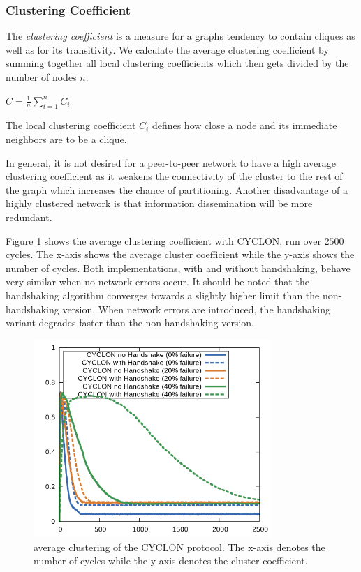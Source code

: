 \documentclass[11pt, english, screen]{report-rd-info}
\begin{document}
\subsubsection{Clustering Coefficient}

The \emph{clustering coefficient} is a measure for a graphs tendency to contain cliques as well as for its transitivity.
We calculate the average clustering coefficient by summing together all local clustering coefficients which then gets divided by the number of nodes $n$. 

$\bar{C} = \frac{1}{n}\sum\limits_{i=1}^{n} C_i$


The local clustering coefficient $C_i$ defines how close a node and its immediate neighbors are to be a clique.

In general, it is not desired for a peer-to-peer network to have a high average clustering coefficient as it weakens the connectivity of the cluster to the rest of the graph which increases the chance of partitioning.
Another disadvantage of a highly clustered network is that information dissemination will be more redundant.


Figure \ref{fig:cluster_cyclon3} shows the average clustering coefficient with CYCLON, run over $2500$ cycles. The x-axis shows the average cluster coefficient while the y-axis shows the number of cycles.
Both implementations, with and without handshaking, behave very similar when no network errors occur.
It should be noted that the handshaking algorithm converges towards a slightly higher limit than the non-handshaking version.
When network errors are introduced, the handshaking variant degrades faster than the non-handshaking version.


\begin{figure}
    \centering
    \includegraphics[width=9cm]{Images/statistics/cyclon_1000_c20/all}
    \caption{average clustering of the CYCLON protocol.
    The x-axis denotes the number of cycles while the y-axis denotes the cluster coefficient.}
    \label{fig:cluster_cyclon3}
\end{figure}
\end{document}
